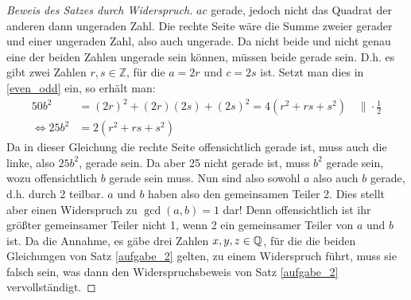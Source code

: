 \begin{proof}[Beweis des Satzes durch Widerspruch]
    $ac$ gerade, jedoch nicht das Quadrat der anderen dann ungeraden Zahl. Die rechte Seite wäre die Summe zweier 
    gerader und  einer ungeraden Zahl, also auch ungerade. Da nicht beide und nicht genau eine der beiden Zahlen 
    ungerade sein können, müssen beide gerade sein. D.h. es gibt zwei Zahlen $r, s \in \mathbb{Z}$, für die $a = 2r$ und 
    $c = 2s$ ist. Setzt man dies in \eqref{even_odd} ein, so erhält man:
    \begin{align*}
        50 b^2 &= (2r)^2 + (2r)(2s) + (2s)^2 = 4 \left( r^2 + rs + s^2 \right) \quad \| \cdot \frac12\\
        \iff 25b^2 &= 2 \left( r^2 + rs + s^2 \right)
    \end{align*}
    Da in dieser Gleichung die rechte Seite offensichtlich gerade ist, muss auch die linke, also $25b^2$, gerade sein. 
    Da aber 25 nicht gerade ist, muss $b^2$ gerade sein, wozu offensichtlich $b$ gerade sein muss. Nun sind also 
    sowohl $a$ also auch $b$ gerade, d.h. durch 2 teilbar. $a$ und $b$ haben also den gemeinsamen Teiler 2. Dies 
    stellt aber einen Widerspruch zu $\gcd(a, b) = 1$ dar! Denn offensichtlich ist ihr größter gemeinsamer Teiler 
    nicht 1, wenn 2 ein gemeinsamer Teiler von $a$ und $b$ ist. Da die Annahme, es gäbe drei Zahlen $x, y, z\in \mathbb{Q}$, 
    für die die beiden Gleichungen von Satz \ref{aufgabe_2} gelten, zu einem Widerspruch führt, muss sie falsch sein, 
    was dann den Widerspruchsbeweis von Satz \ref{aufgabe_2} vervollständigt.
\end{proof}